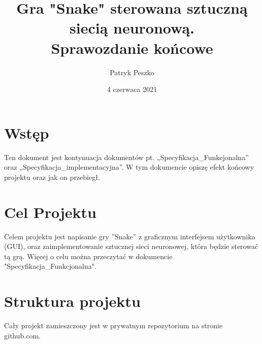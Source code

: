 \documentclass{article}
\title{Gra "Snake" sterowana sztuczną siecią neuronową. \\ Sprawozdanie końcowe}
\author{Patryk Peszko}
\date{4 czerwaca 2021}
\begin{document}
	\begin{titlepage}
		\clearpage\maketitle\thispagestyle{empty}
		\maketitle
	\end{titlepage}

\newpage
{}
\thispagestyle{empty}
\tableofcontents
\newpage
\section{Wstęp}
    Ten dokument jest kontynuacja dokumentów pt. „Specyfikacja\_Funkcjonalna” oraz „Specyfikacja\_implementacyjna”. W tym dokumencie opiszę efekt końcowy projektu oraz jak on przebiegł.
\section{Cel Projektu}
    Celem projektu jest napisanie gry ”Snake” z graficznym interfejsem użytkownika (GUI), oraz zaimplementowanie sztucznej sieci neuronowej, która będzie sterować tą grą. Więcej o celu można przeczytać w dokumencie "Specyfikacja\_Funkcjonalna".
\section{Struktura projektu}
    Cały projekt zamieszczony jest w prywatnym repozytorium na stronie github.com.
\end{document}
